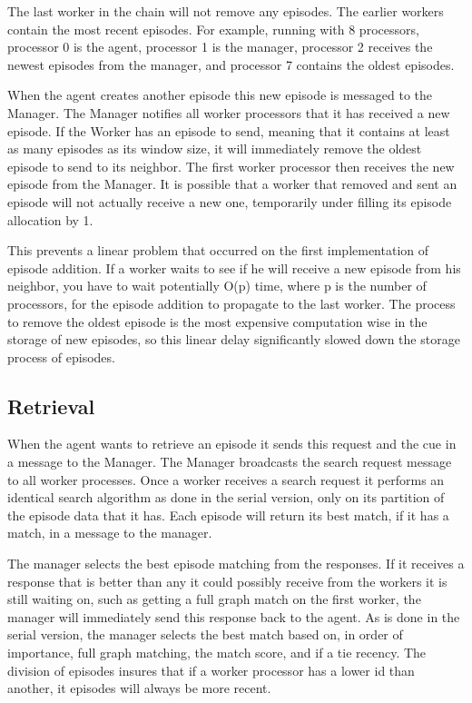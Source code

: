 \documentclass[11pt]{article} %
\begin{document}
The last worker in the chain will not remove any episodes. The earlier workers
contain the most recent episodes. For example, running with 8 processors,
processor 0 is the agent, processor 1 is the manager, processor 2 receives the
newest episodes from the manager, and processor 7 contains the oldest episodes.

When the agent creates another episode this new episode is messaged to the
Manager. The Manager notifies all worker processors that it has received a new
episode. If the Worker has an episode to send, meaning that it contains at least
as many episodes as its window size, it will immediately remove the oldest
episode to send to its neighbor. The first worker processor then receives the
new episode from the Manager. It is possible that a worker that removed and sent
an episode will not actually receive a new one, temporarily under filling its
episode allocation by 1.

This prevents a linear problem that occurred on the first implementation of
episode addition. If a worker waits to see if he will receive a new episode from
his neighbor, you have to wait potentially O(p) time, where p is the number of
processors, for the episode addition to propagate to the last worker. The
process to remove the oldest episode is the most expensive computation wise in
the storage of new episodes, so this linear delay significantly slowed down the
storage process of episodes.


\subsection{Retrieval}
When the agent wants to retrieve an episode it sends this request and the cue in
a message to the Manager. The Manager broadcasts the search request message to
all worker processes. Once a worker receives a search request it performs an
identical search algorithm as done in the serial version, only on its partition
of the episode data that it has. Each episode will return its best match, if it
has a match, in a message to the manager.

The manager selects the best episode matching from the responses. If it receives
a response that is better than any it could possibly receive from the workers it
is still waiting on, such as getting a full graph match on the first worker, the
manager will immediately send this response back to the agent. As is done in the
serial version, the manager selects the best match based on, in order of
importance, full graph matching, the match score, and if a tie recency. The
division of episodes insures that if a worker processor has a lower id than
another, it episodes will always be more recent.
\end{document}
